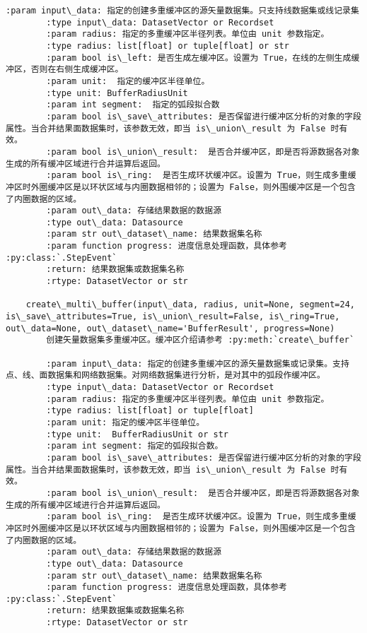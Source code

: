 \documentclass[11pt]{article}
\begin{document}
\begin{Verbatim}[commandchars=\\\{\}]
        :param input\_data: 指定的创建多重缓冲区的源矢量数据集。只支持线数据集或线记录集
        :type input\_data: DatasetVector or Recordset
        :param radius: 指定的多重缓冲区半径列表。单位由 unit 参数指定。
        :type radius: list[float] or tuple[float] or str
        :param bool is\_left: 是否生成左缓冲区。设置为 True，在线的左侧生成缓冲区，否则在右侧生成缓冲区。
        :param unit:  指定的缓冲区半径单位。
        :type unit: BufferRadiusUnit
        :param int segment:  指定的弧段拟合数
        :param bool is\_save\_attributes: 是否保留进行缓冲区分析的对象的字段属性。当合并结果面数据集时，该参数无效，即当 is\_union\_result 为 False 时有效。
        :param bool is\_union\_result:  是否合并缓冲区，即是否将源数据各对象生成的所有缓冲区域进行合并运算后返回。
        :param bool is\_ring:  是否生成环状缓冲区。设置为 True，则生成多重缓冲区时外圈缓冲区是以环状区域与内圈数据相邻的；设置为 False，则外围缓冲区是一个包含了内圈数据的区域。
        :param out\_data: 存储结果数据的数据源
        :type out\_data: Datasource
        :param str out\_dataset\_name: 结果数据集名称
        :param function progress: 进度信息处理函数，具体参考 :py:class:`.StepEvent`
        :return: 结果数据集或数据集名称
        :rtype: DatasetVector or str
    
    create\_multi\_buffer(input\_data, radius, unit=None, segment=24, is\_save\_attributes=True, is\_union\_result=False, is\_ring=True, out\_data=None, out\_dataset\_name='BufferResult', progress=None)
        创建矢量数据集多重缓冲区。缓冲区介绍请参考 :py:meth:`create\_buffer`
        
        :param input\_data: 指定的创建多重缓冲区的源矢量数据集或记录集。支持点、线、面数据集和网络数据集。对网络数据集进行分析，是对其中的弧段作缓冲区。
        :type input\_data: DatasetVector or Recordset
        :param radius: 指定的多重缓冲区半径列表。单位由 unit 参数指定。
        :type radius: list[float] or tuple[float]
        :param unit: 指定的缓冲区半径单位。
        :type unit:  BufferRadiusUnit or str
        :param int segment: 指定的弧段拟合数。
        :param bool is\_save\_attributes: 是否保留进行缓冲区分析的对象的字段属性。当合并结果面数据集时，该参数无效，即当 is\_union\_result 为 False 时有效。
        :param bool is\_union\_result:  是否合并缓冲区，即是否将源数据各对象生成的所有缓冲区域进行合并运算后返回。
        :param bool is\_ring:  是否生成环状缓冲区。设置为 True，则生成多重缓冲区时外圈缓冲区是以环状区域与内圈数据相邻的；设置为 False，则外围缓冲区是一个包含了内圈数据的区域。
        :param out\_data: 存储结果数据的数据源
        :type out\_data: Datasource
        :param str out\_dataset\_name: 结果数据集名称
        :param function progress: 进度信息处理函数，具体参考 :py:class:`.StepEvent`
        :return: 结果数据集或数据集名称
        :rtype: DatasetVector or str
    

\end{Verbatim}
\end{document}
